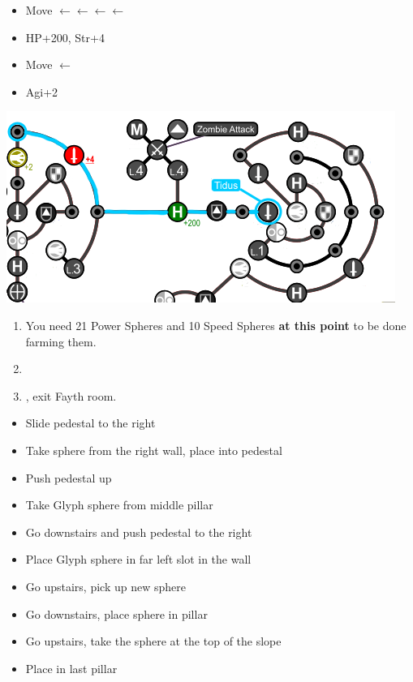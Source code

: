 \begin{spheregrid}
    \begin{itemize}
        \tidusf
        \begin{itemize}
            \item Move $\leftarrow\leftarrow\leftarrow\leftarrow$
            \item HP+200, Str+4
            \item Move $\leftarrow$
            \item Agi+2
        \end{itemize}
        \includegraphics[width=.8\columnwidth]{graphics/Tidus_Post_Seymour}
    \end{itemize}
\end{spheregrid}
\winvfill
\begin{enumerate}[resume]
    \item You need 21 Power Spheres and 10 Speed Spheres \textbf{at this point} to be done farming them.
    \item \formation{\rikku}{\tidus}{\kimahri}
    \item \save, exit Fayth room.
\end{enumerate}
\begin{trial}
    \begin{itemize}
        \item Slide pedestal to the right
        \item Take sphere from the right wall, place into pedestal
        \item Push pedestal up
        \item Take Glyph sphere from middle pillar
        \item Go downstairs and push pedestal to the right
        \item Place Glyph sphere in far left slot in the wall
        \item Go upstairs, pick up new sphere
        \item Go downstairs, place sphere in pillar
        \item Go upstairs, take the sphere at the top of the slope
        \item Place in last pillar
    \end{itemize}
\end{trial}
